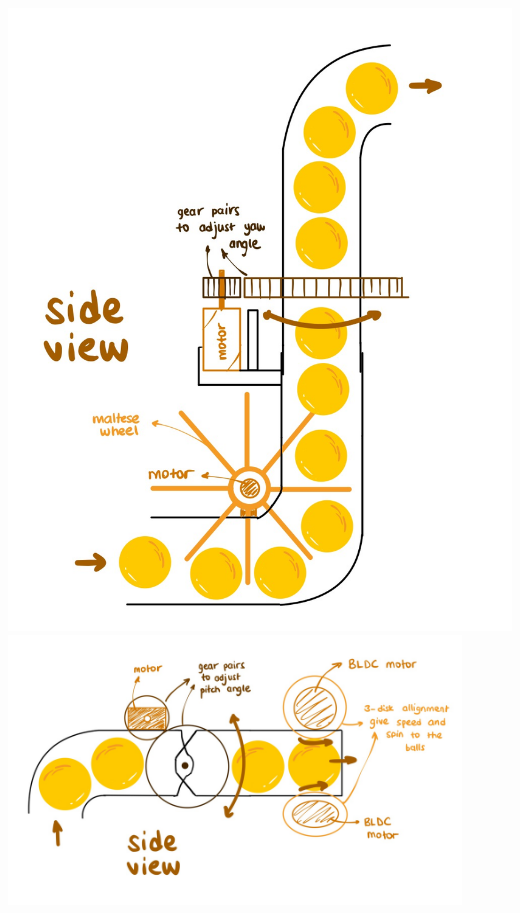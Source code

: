 \documentclass[12pt]{report}
\begin{document}
\hfill
\begin{minipage}[t]{0.25\textwidth}
    \centering
    \includegraphics[width=\textwidth]{best_concept/side_feeder.jpeg}
    \vspace{1em}
    \includegraphics[width=0.9\textwidth]{best_concept/side.jpeg}
    \vspace{1em}

\end{minipage}
\end{document}
